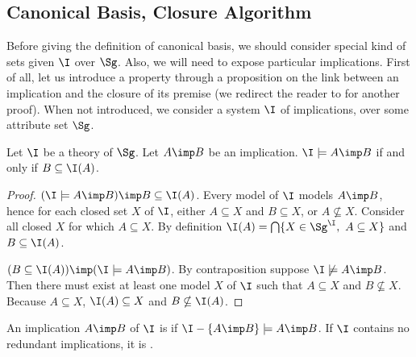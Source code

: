 
\subsection{Canonical Basis, Closure Algorithm}

Before giving the definition of canonical basis, we should consider special 
kind of sets given $\I$ over $\Sg$. Also, we will need to expose particular
implications. First of all, let us introduce a property through a proposition
on the link between an implication and the closure of its premise (we redirect the reader to \cite{ganter_conceptual_2016} for another proof). When not introduced, we consider a system $\I$ of implications, over some attribute set $\Sg$.

\begin{proposition} Let $\I$ be a theory of $\Sg$. Let $A \imp B$ be an implication. $\I \models A \imp B$ if and only if $B \subseteq \I(A)$.	
\end{proposition}

\begin{proof} $(\I \models A \imp B) \imp B \subseteq \I(A)$. Every model
of $\I$ models $A \imp B$, hence for each closed set $X$ of $\I$, either 
$A \subseteq X $ and $B \subseteq X$, or $A \nsubseteq X$. Consider all closed 
$X$ for which $A \subseteq X$. By definition $\I(A) = \bigcap \{X \in 
\Sg^{\I},\  A \subseteq X \}$ and $B \subseteq \I(A)$.

\vspace{1.2em}

$(B \subseteq \I(A)) \imp (\I \models A \imp B)$. By contraposition suppose 
$\I \not\models A \imp B$. Then there must exist at least one model $X$ of $\I$
such that $A \subseteq X$ and $B \nsubseteq X$. Because $A \subseteq X$, 
$\I(A) \subseteq X$ and $B \nsubseteq \I(A)$.
	
\end{proof}

\begin{definition} An implication $A \imp B$ of $\I$ is 
 if $\I - \{A \imp B \} \models A \imp B$. If $\I$ 
contains no redundant implications, it is .
	
\end{definition}

